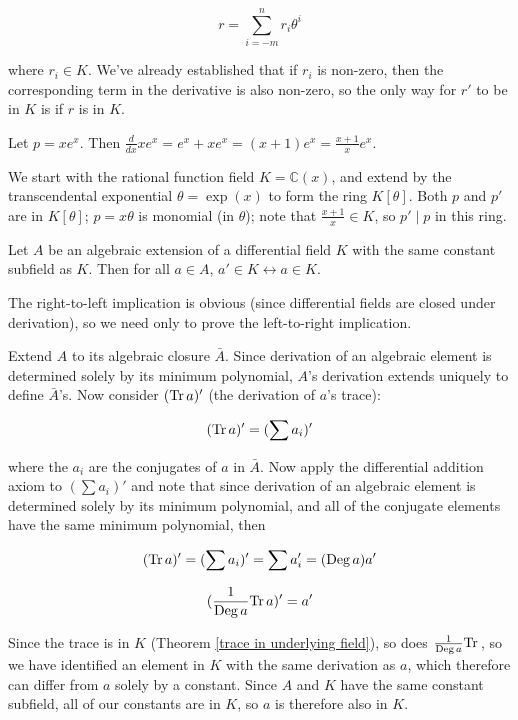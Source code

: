 $$r = \sum_{i=-m}^n r_i \theta^i$$

where $r_i \in K$.  We've already established that if $r_i$ is
non-zero, then the corresponding term in the derivative
is also non-zero, so the only way for $r'$ to be in $K$ is if
$r$ is in $K$.

\endtheorem

\example Let $p = x e^x$.  Then
$\frac{d}{dx} x e^x = e^x + x e^x = (x+1) e^x = \frac{x+1}{x} e^x$.

We start with the rational function field $K = {\mathbb C}(x)$, and
extend by the transcendental exponential $\theta = \exp(x)$ to form
the ring $K[\theta]$.  Both $p$ and $p'$ are in $K[\theta]$;
$p=x\theta$ is monomial (in $\theta$); note that $\frac{x+1}{x} \in
K$, so $p' \mid p$ in this ring.

\endexample

\theorem\label{basic algebraic properties}

Let $A$ be an algebraic extension of a differential field $K$ with the
same constant subfield as $K$.  Then for all $a\in A$, $a' \in K
\leftrightarrow a \in K$.

\proof

The right-to-left implication is obvious (since differential fields
are closed under derivation), so we need only to prove the
left-to-right implication.

Extend $A$ to its algebraic closure $\bar{A}$.  Since derivation of an
algebraic element is determined solely by its minimum polynomial,
$A$'s derivation extends uniquely to define $\bar{A}$'s.  Now
consider $({\rm Tr\,} a)'$ (the derivation of $a$'s trace):

$$({\rm Tr\,} a)' = (\sum a_i)'$$

where the $a_i$ are the conjugates of $a$ in $\bar{A}$.  Now apply the
differential addition axiom to $(\sum a_i)'$ and note that since
derivation of an algebraic element is determined solely by its minimum
polynomial, and all of the conjugate elements have the same minimum
polynomial, then

$$({\rm Tr\,} a)' = (\sum a_i)' = \sum a_i' = ({\rm Deg\,}a) a'$$

$$(\frac{1}{{\rm Deg\,} a}{\rm Tr\,} a)' = a'$$

Since the trace is in $K$ (Theorem \ref{trace in underlying field}),
so does $\frac{1}{{\rm Deg\,} a}{\rm Tr\,}$, so we have identified an
element in $K$ with the same derivation as $a$, which therefore can
differ from $a$ solely by a constant.  Since $A$ and $K$ have the same
constant subfield, all of our constants are in $K$, so $a$ is
therefore also in $K$.

